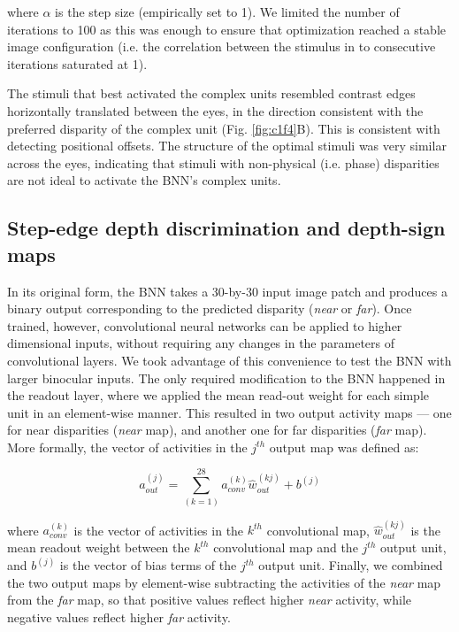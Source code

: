 where $\alpha$ is the step size (empirically set to 1). We limited the number of iterations to 100 as this was enough to ensure that optimization reached a stable image configuration (i.e. the correlation between the stimulus in to consecutive iterations saturated at 1). 

The stimuli that best activated the complex units resembled contrast edges horizontally translated between the eyes, in the direction consistent with the preferred disparity of the complex unit (Fig. \ref{fig:c1f4}B). This is consistent with detecting positional offsets. The structure of the optimal stimuli was very similar across the eyes, indicating that stimuli with non-physical (i.e. phase) disparities are not ideal to activate the BNN's complex units. 


\subsection*{Step-edge depth discrimination and depth-sign maps}

In its original form, the BNN takes a 30-by-30 input image patch and produces a binary output corresponding to the predicted disparity ({\it near} or {\it far}). Once trained, however, convolutional neural networks can be applied to higher dimensional inputs, without requiring any changes in the parameters of convolutional layers. We took advantage of this convenience to test the BNN with larger binocular inputs. The only required modification to the BNN happened in the readout layer, where we applied the mean read-out weight for each simple unit in an element-wise manner. This resulted in two output activity maps --- one for near disparities ({\it near} map), and another one for far disparities ({\it far} map). More formally, the vector of activities in the $j^{th}$ output map was defined as:

\begin{equation}
  a_{out}^{(j)}= \sum_{(k=1)}^{28} a_{conv}^{(k)} \hat{w}_{out}^{(kj)} + b^{(j)}
\end{equation}

where $a_{conv}^{(k)}$ is the vector of activities in the $k^{th}$ convolutional map, $\hat{w}_{out}^{(kj)}$ is the mean readout weight between the $k^{th}$ convolutional map and the $j^{th}$ output unit, and $b^{(j)}$ is the vector of bias terms of the $j^{th}$ output unit. Finally, we combined the two output maps by element-wise subtracting the activities of the {\it near} map from the {\it far} map, so that positive values reflect higher {\it near} activity, while negative values reflect higher {\it far} activity.


